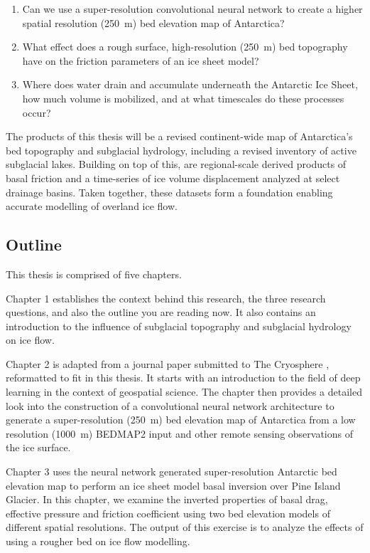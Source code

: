 \begin{enumerate}
  \item Can we use a super-resolution convolutional neural network to create a higher spatial resolution (\SI{250}{\metre}) bed elevation map of Antarctica?

  \item What effect does a rough surface, high-resolution (\SI{250}{\metre}) bed topography have on the friction parameters of an ice sheet model?

  \item Where does water drain and accumulate underneath the Antarctic Ice Sheet, how much volume is mobilized, and at what timescales do these processes occur?
\end{enumerate}

The products of this thesis will be a revised continent-wide map of Antarctica's bed topography and subglacial hydrology, including a revised inventory of active subglacial lakes.
Building on top of this, are regional-scale derived products of basal friction and a time-series of ice volume displacement analyzed at select drainage basins.
Taken together, these datasets form a foundation enabling accurate modelling of overland ice flow.

\subsection{Outline}

This thesis is comprised of five chapters.

Chapter 1 establishes the context behind this research, the three research questions, and also the outline you are reading now.
It also contains an introduction to the influence of subglacial topography and subglacial hydrology on ice flow.

Chapter 2 is adapted from a journal paper submitted to The Cryosphere \citep{LeongDeepBedMapdeepneural2020}, reformatted to fit in this thesis.
It starts with an introduction to the field of deep learning in the context of geospatial science.
The chapter then provides a detailed look into the construction of a convolutional neural network architecture to generate a super-resolution (\SI{250}{\metre}) bed elevation map of Antarctica from a low resolution (\SI{1000}{\metre}) BEDMAP2 input and other remote sensing observations of the ice surface.

Chapter 3 uses the neural network generated super-resolution Antarctic bed elevation map to perform an ice sheet model basal inversion over Pine Island Glacier.
In this chapter, we examine the inverted properties of basal drag, effective pressure and friction coefficient using two bed elevation models of different spatial resolutions.
The output of this exercise is to analyze the effects of using a rougher bed on ice flow modelling.

